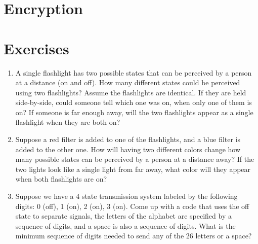 \section{Encryption}

\section{Exercises}

\begin{enumerate}
	\item A single flashlight has two possible states that can be perceived by a person at a distance (on and off). How many different states could be perceived using two flashlights? Assume the flashlights are identical. If they are held side-by-side, could someone tell which one was on, when only one of them is on? If someone is far enough away, will the two flashlights appear as a single flashlight when they are both on?
	
	\item Suppose a red filter is added to one of the flashlights, and a blue filter is added to the other one. How will having two different colors change how many possible states can be perceived by a person at a distance away? If the two lights look like a single light from far away, what color will they appear when both flashlights are on?
	
	\item Suppose we have a 4 state transmission system labeled by the following digits: 0 (off), 1 (on), 2 (on), 3 (on). Come up with a code that uses the off state to separate signals, the letters of the alphabet are specified by a sequence of digits, and a space is also a sequence of digits. What is the minimum sequence of digits needed to send any of the 26 letters or a space? 
\end{enumerate}